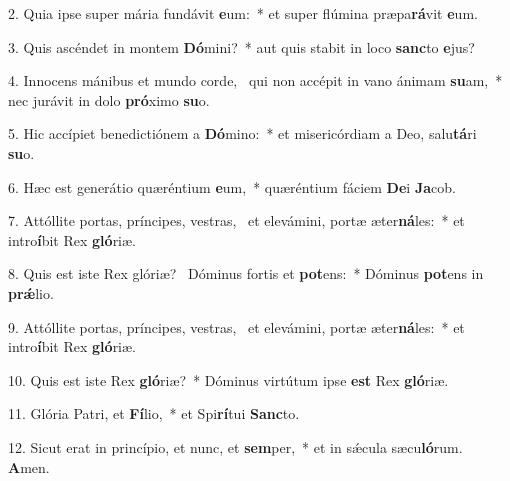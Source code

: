 2. Quia ipse super mária fundávit \textbf{e}um:~*  et super flúmina præpa\textbf{rá}vit \textbf{e}um.\

3. Quis ascéndet in montem \textbf{Dó}mini?~*  aut quis stabit in loco \textbf{sanc}to \textbf{e}jus?\

4. Innocens mánibus et mundo corde, \dag\  qui non accépit in vano ánimam \textbf{su}am,~*  nec jurávit in dolo \textbf{pró}ximo \textbf{su}o.\

5. Hic accípiet benedictiónem a \textbf{Dó}mino:~*  et misericórdiam a Deo, salu\textbf{tá}ri \textbf{su}o.\

6. Hæc est generátio quæréntium \textbf{e}um,~*  quæréntium fáciem \textbf{De}i \textbf{Ja}cob.\

7. Attóllite portas, príncipes, vestras, \dag\  et elevámini, portæ æter\textbf{ná}les:~*  et intro\textbf{í}bit Rex \textbf{gló}riæ.\

8. Quis est iste Rex glóriæ? \dag\  Dóminus fortis et \textbf{pot}ens:~*  Dóminus \textbf{pot}ens in \textbf{prǽ}lio.\

9. Attóllite portas, príncipes, vestras, \dag\  et elevámini, portæ æter\textbf{ná}les:~*  et intro\textbf{í}bit Rex \textbf{gló}riæ.\

10. Quis est iste Rex \textbf{gló}riæ?~*  Dóminus virtútum ipse \textbf{est} Rex \textbf{gló}riæ.\

11. Glória Patri, et \textbf{Fí}lio,~*  et Spi\textbf{rí}tui \textbf{Sanc}to.\

12. Sicut erat in princípio, et nunc, et \textbf{sem}per,~*  et in sǽcula sæcu\textbf{ló}rum. \textbf{A}men.\

